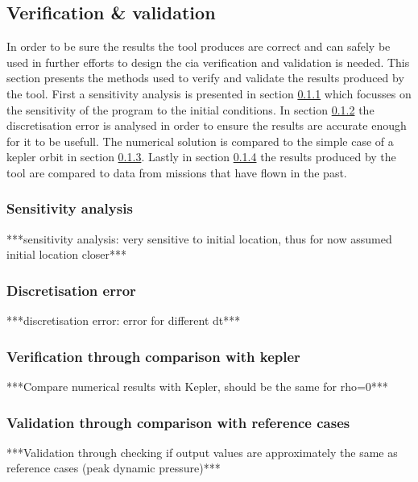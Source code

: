 \subsection{Verification \& validation}
\label{sec:astrovv}
In order to be sure the results the tool produces are correct and can safely be used in further efforts to design the \gls{cia} verification and validation is needed. This section presents the methods used to verify and validate the results produced by the tool. First a sensitivity analysis is presented in section \ref{sec:astrosens} which focusses on the sensitivity of the program to the initial conditions. In section \ref{sec:astrodisc} the discretisation error is analysed in order to ensure the results are accurate enough for it to be usefull. The numerical solution is compared to the simple case of a kepler orbit in section \ref{sec:astroverf}. Lastly in section \ref{sec:astroval} the results produced by the tool are compared to data from missions that have flown in the past.

\subsubsection{Sensitivity analysis}
\label{sec:astrosens}
***sensitivity analysis: very sensitive to initial location, thus for now assumed initial location closer***\\

\subsubsection{Discretisation error}
\label{sec:astrodisc}
***discretisation error: error for different dt***\\

\subsubsection{Verification through comparison with kepler}
\label{sec:astroverf}
***Compare numerical results with Kepler, should be the same for rho=0***\\

\subsubsection{Validation through comparison with reference cases}
\label{sec:astroval}
***Validation through checking if output values are approximately the same as reference cases (peak dynamic pressure)***\\

